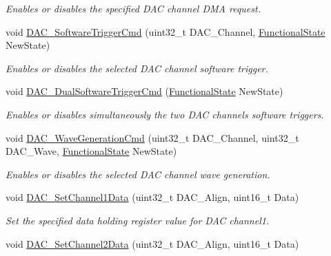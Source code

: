 \begin{DoxyCompactItemize}
\begin{DoxyCompactList}\small\item\em Enables or disables the specified D\+AC channel D\+MA request. \end{DoxyCompactList}\item 
void \hyperlink{group___d_a_c___exported___functions_ga46f9f7f6b9520a86e300fe966afe5fb3}{D\+A\+C\+\_\+\+Software\+Trigger\+Cmd} (uint32\+\_\+t D\+A\+C\+\_\+\+Channel, \hyperlink{group___exported__types_gac9a7e9a35d2513ec15c3b537aaa4fba1}{Functional\+State} New\+State)
\begin{DoxyCompactList}\small\item\em Enables or disables the selected D\+AC channel software trigger. \end{DoxyCompactList}\item 
void \hyperlink{group___d_a_c___exported___functions_gab4d3b364a6b184dcd65f3b294ebf56dc}{D\+A\+C\+\_\+\+Dual\+Software\+Trigger\+Cmd} (\hyperlink{group___exported__types_gac9a7e9a35d2513ec15c3b537aaa4fba1}{Functional\+State} New\+State)
\begin{DoxyCompactList}\small\item\em Enables or disables simultaneously the two D\+AC channels software triggers. \end{DoxyCompactList}\item 
void \hyperlink{group___d_a_c___exported___functions_gabd51ae6880821d4dcd923969ec19a19e}{D\+A\+C\+\_\+\+Wave\+Generation\+Cmd} (uint32\+\_\+t D\+A\+C\+\_\+\+Channel, uint32\+\_\+t D\+A\+C\+\_\+\+Wave, \hyperlink{group___exported__types_gac9a7e9a35d2513ec15c3b537aaa4fba1}{Functional\+State} New\+State)
\begin{DoxyCompactList}\small\item\em Enables or disables the selected D\+AC channel wave generation. \end{DoxyCompactList}\item 
void \hyperlink{group___d_a_c___exported___functions_gad06b4230d2b17d1d13f41dce4c782461}{D\+A\+C\+\_\+\+Set\+Channel1\+Data} (uint32\+\_\+t D\+A\+C\+\_\+\+Align, uint16\+\_\+t Data)
\begin{DoxyCompactList}\small\item\em Set the specified data holding register value for D\+AC channel1. \end{DoxyCompactList}\item 
void \hyperlink{group___d_a_c___exported___functions_ga44e12006ec186791378d132da8541552}{D\+A\+C\+\_\+\+Set\+Channel2\+Data} (uint32\+\_\+t D\+A\+C\+\_\+\+Align, uint16\+\_\+t Data)

\end{DoxyCompactItemize}
